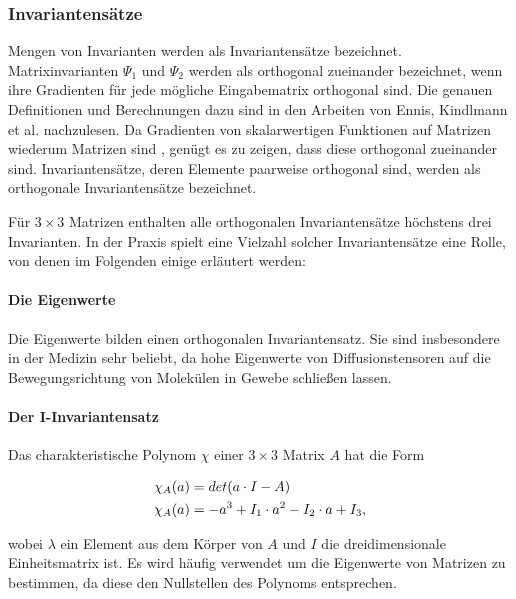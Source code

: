\documentclass[a4paper,fontsize=12pt,toc=bib,halfparskip,ngerman]{scrartcl}
\begin{document}
\subsubsection{Invariantens\"atze} 
\label{sec:Invariants}
Mengen von Invarianten werden als Invariantens\"atze bezeichnet.
Matrixinvarianten $\Psi_1$ und $\Psi_2$ werden als orthogonal zueinander bezeichnet, wenn ihre Gradienten f\"ur jede m\"ogliche Eingabematrix orthogonal sind. Die genauen Definitionen und Berechnungen dazu sind in den Arbeiten von Ennis, Kindlmann et al. \cite{ennis2006orthogonal} nachzulesen. Da Gradienten von skalarwertigen Funktionen auf Matrizen wiederum Matrizen sind \cite[S.~137]{ennis2006orthogonal}, gen\"ugt es zu zeigen, dass diese orthogonal zueinander sind. Invariantens\"atze, deren Elemente paarweise orthogonal sind, werden als orthogonale Invariantens\"atze bezeichnet.

F\"ur $3\times 3$ Matrizen enthalten alle orthogonalen Invariantens\"atze h\"ochstens drei Invarianten. In der Praxis spielt eine Vielzahl solcher Invariantens\"atze eine Rolle, von denen im Folgenden einige erl\"autert werden:

\paragraph{Die Eigenwerte}

Die Eigenwerte bilden einen orthogonalen Invariantensatz. Sie sind insbesondere in der Medizin sehr beliebt, da hohe Eigenwerte von Diffusionstensoren auf die Bewegungsrichtung von Molek\"ulen in Gewebe schlie{\ss}en lassen.

\paragraph{Der I-Invariantensatz}
Das charakteristische Polynom $\chi$ einer $3\times3$ Matrix $A$ hat die Form

\begin{equation}
	\centering
	\begin{split}
	&\chi_A(a) = det(a \cdot I - A)\\
	&\chi_A(a) = -a^3 + I_1\cdot a^2 - I_2\cdot a + I_3,
	\end{split}
\end{equation}

wobei $\lambda$ ein Element aus dem K\"orper von $A$ und $I$ die dreidimensionale Einheitsmatrix ist. Es wird h\"aufig verwendet um die Eigenwerte von Matrizen zu bestimmen, da diese den Nullstellen des Polynoms entsprechen.
\end{document}
